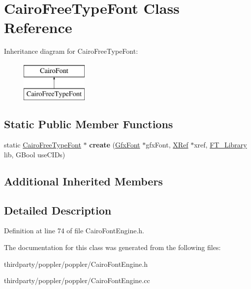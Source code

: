 \hypertarget{class_cairo_free_type_font}{}\section{Cairo\+Free\+Type\+Font Class Reference}
\label{class_cairo_free_type_font}
Inheritance diagram for Cairo\+Free\+Type\+Font\+:\begin{figure}[H]
\begin{center}
\leavevmode
\includegraphics[height=2.000000cm]{class_cairo_free_type_font}
\end{center}
\end{figure}
\subsection*{Static Public Member Functions}
\begin{DoxyCompactItemize}
\item 
\mbox{\label{class_cairo_free_type_font_aea492a35fb8d7f2e733c0b28ce2e7ab9}} 
static \hyperlink{class_cairo_free_type_font}{Cairo\+Free\+Type\+Font} $\ast$ {\bfseries create} (\hyperlink{class_gfx_font}{Gfx\+Font} $\ast$gfx\+Font, \hyperlink{class_x_ref}{X\+Ref} $\ast$xref, \hyperlink{struct_f_t___library_rec__}{F\+T\+\_\+\+Library} lib, G\+Bool use\+C\+I\+Ds)
\end{DoxyCompactItemize}
\subsection*{Additional Inherited Members}


\subsection{Detailed Description}


Definition at line 74 of file Cairo\+Font\+Engine.\+h.



The documentation for this class was generated from the following files\+:\begin{DoxyCompactItemize}
\item 
thirdparty/poppler/poppler/Cairo\+Font\+Engine.\+h\item 
thirdparty/poppler/poppler/Cairo\+Font\+Engine.\+cc\end{DoxyCompactItemize}
